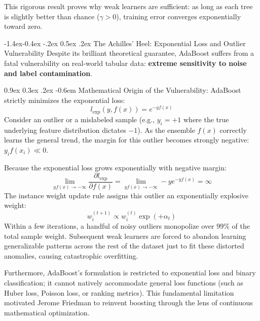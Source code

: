 \documentclass[11pt,a4paper]{article}
\makeatletter
\renewcommand\subsection{\@startsection{subsection}{2}{\z@}%
                                     {-1.4ex\@plus -0.4ex \@minus -.2ex}%
                                     {0.5ex \@plus .2ex}%
                                     {\normalfont\normalsize\bfseries}}
\renewcommand\paragraph{\@startsection{paragraph}{4}{\z@}%
                                     {0.9ex \@plus0.3ex \@minus.2ex}%
                                     {-0.6em}%
                                     {\normalfont\normalsize\bfseries}}
\makeatother
\begin{document}
This rigorous result proves why weak learners are sufficient: as long as each tree is slightly better than chance ($\gamma > 0$), training error converges exponentially toward zero.

\subsection{The Achilles' Heel: Exponential Loss and Outlier Vulnerability}
\label{sec:outlier_vulnerability}
Despite its brilliant theoretical guarantee, AdaBoost suffers from a fatal vulnerability on real-world tabular data: \textbf{extreme sensitivity to noise and label contamination}.

\paragraph{Mathematical Origin of the Vulnerability:}
AdaBoost strictly minimizes the exponential loss:
\begin{equation}
    l_{\text{exp}}(y, f(x)) = e^{-y f(x)}
\end{equation}
Consider an outlier or a mislabeled sample (e.g., $y_i = +1$ where the true underlying feature distribution dictates $-1$). As the ensemble $f(x)$ correctly learns the general trend, the margin for this outlier becomes strongly negative: $y_i f(x_i) \ll 0$.

Because the exponential loss grows exponentially with negative margin:
\begin{equation}
    \lim_{y f(x) \to -\infty} \frac{\partial l_{\text{exp}}}{\partial f(x)} = \lim_{y f(x) \to -\infty} -y e^{-y f(x)} = \infty
\end{equation}
The instance weight update rule assigns this outlier an exponentially explosive weight:
\begin{equation}
    w_i^{(t+1)} \propto w_i^{(t)} \exp(+\alpha_t)
\end{equation}
Within a few iterations, a handful of noisy outliers monopolize over $99\%$ of the total sample weight. Subsequent weak learners are forced to abandon learning generalizable patterns across the rest of the dataset just to fit these distorted anomalies, causing catastrophic overfitting.

Furthermore, AdaBoost's formulation is restricted to exponential loss and binary classification; it cannot natively accommodate general loss functions (such as Huber loss, Poisson loss, or ranking metrics). This fundamental limitation motivated Jerome Friedman to reinvent boosting through the lens of continuous mathematical optimization.
\end{document}
